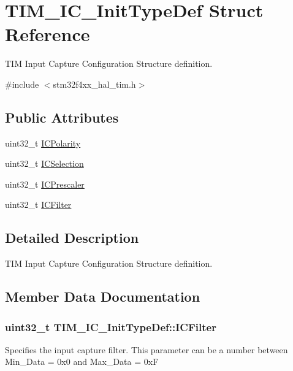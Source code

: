 \hypertarget{struct_t_i_m___i_c___init_type_def}{}\section{T\+I\+M\+\_\+\+I\+C\+\_\+\+Init\+Type\+Def Struct Reference}
\label{struct_t_i_m___i_c___init_type_def}


T\+IM Input Capture Configuration Structure definition.  




{\ttfamily \#include $<$stm32f4xx\+\_\+hal\+\_\+tim.\+h$>$}

\subsection*{Public Attributes}
\begin{DoxyCompactItemize}
\item 
uint32\+\_\+t \hyperlink{struct_t_i_m___i_c___init_type_def_ab122383ebc0926c49a814546471da9b3}{I\+C\+Polarity}
\item 
uint32\+\_\+t \hyperlink{struct_t_i_m___i_c___init_type_def_aad80556490de79727ba1269c851e9724}{I\+C\+Selection}
\item 
uint32\+\_\+t \hyperlink{struct_t_i_m___i_c___init_type_def_a452a4a459b6f7b7c478db032de9b0d72}{I\+C\+Prescaler}
\item 
uint32\+\_\+t \hyperlink{struct_t_i_m___i_c___init_type_def_ae8432aa11b5495b252ac7ae299eabb32}{I\+C\+Filter}
\end{DoxyCompactItemize}


\subsection{Detailed Description}
T\+IM Input Capture Configuration Structure definition. 

\subsection{Member Data Documentation}
\subsubsection[{\texorpdfstring{I\+C\+Filter}{ICFilter}}]{\setlength{\rightskip}{0pt plus 5cm}uint32\+\_\+t T\+I\+M\+\_\+\+I\+C\+\_\+\+Init\+Type\+Def\+::\+I\+C\+Filter}\hypertarget{struct_t_i_m___i_c___init_type_def_ae8432aa11b5495b252ac7ae299eabb32}{}\label{struct_t_i_m___i_c___init_type_def_ae8432aa11b5495b252ac7ae299eabb32}
Specifies the input capture filter. This parameter can be a number between Min\+\_\+\+Data = 0x0 and Max\+\_\+\+Data = 0xF 

